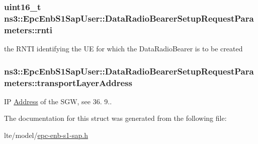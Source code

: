 \subsubsection[{\texorpdfstring{rnti}{rnti}}]{\setlength{\rightskip}{0pt plus 5cm}uint16\+\_\+t ns3\+::\+Epc\+Enb\+S1\+Sap\+User\+::\+Data\+Radio\+Bearer\+Setup\+Request\+Parameters\+::rnti}\hypertarget{structns3_1_1EpcEnbS1SapUser_1_1DataRadioBearerSetupRequestParameters_a7e5dff79d4396915b8cf096270cbeb2e}{}\label{structns3_1_1EpcEnbS1SapUser_1_1DataRadioBearerSetupRequestParameters_a7e5dff79d4396915b8cf096270cbeb2e}
the R\+N\+TI identifying the UE for which the Data\+Radio\+Bearer is to be created 
\subsubsection[{\texorpdfstring{transport\+Layer\+Address}{transportLayerAddress}}]{ ns3\+::\+Epc\+Enb\+S1\+Sap\+User\+::\+Data\+Radio\+Bearer\+Setup\+Request\+Parameters\+::transport\+Layer\+Address}\hypertarget{structns3_1_1EpcEnbS1SapUser_1_1DataRadioBearerSetupRequestParameters_af8739922a7cec5bf98f37837de18dcee}{}\label{structns3_1_1EpcEnbS1SapUser_1_1DataRadioBearerSetupRequestParameters_af8739922a7cec5bf98f37837de18dcee}
IP \hyperlink{classns3_1_1Address}{Address} of the S\+GW, see 36. 9.. 

The documentation for this struct was generated from the following file\+:\begin{DoxyCompactItemize}
\item 
lte/model/\hyperlink{epc-enb-s1-sap_8h}{epc-\/enb-\/s1-\/sap.\+h}\end{DoxyCompactItemize}
